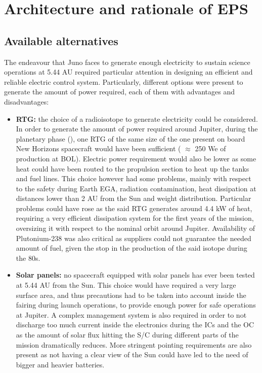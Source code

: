 \section{Architecture and rationale of EPS}
\label{sec:EPS_architecture_rationale}

\subsection{Available alternatives}
\label{subsec:available_alternatives}

The endeavour that Juno faces to generate enough electricity to sustain science operations at 5.44 AU required particular attention in designing an efficient and reliable electric control system. Particularly, different options were present to generate the amount of power required, each of them with advantages and disadvantages:

\begin{itemize}
    \item \textbf{RTG:} the choice of a radioisotope to generate electricity could be considered. In order to generate the amount of power required around Jupiter, during the planetary phase 
    (\mref), 
    one RTG of the same size of the one present on board New Horizons spacecraft  would have been sufficient ( $\approx$ 250 We of production at BOL)\cite{nh_rtg}. Electric power requirement would also be lower as some heat could have been routed to the propulsion section to heat up the tanks and fuel lines. This choice however had some problems, mainly with respect to the safety during Earth EGA, radiation contamination, heat dissipation at distances lower than 2 AU from the Sun and weight distribution. Particular problems could have rose as the said RTG generates around 4.4 kW of heat, requiring a very efficient dissipation system for the first years of the mission, oversizing it with respect to the nominal orbit around Jupiter. Availability of Plutonium-238 was also critical as suppliers could not guarantee the needed amount of fuel, given the stop in the production of the said isotope during the 80s. 
    \mref %
    \item \textbf{Solar panels:} no spacecraft equipped with solar panels has ever been tested at 5.44 AU from the Sun. This choice would have required a very large surface area, and thus precautions had to be taken into account inside the fairing during launch operations, to provide enough power for safe operations at Jupiter. A complex management system is also required in order to not discharge too much current inside the electronics during the ICs and the OC as the amount of solar flux hitting the S/C during different parts of the mission dramatically reduces. More stringent pointing requirements are also present as not having a clear view of the Sun could have led to the need of bigger and heavier batteries. 
\end{itemize}

